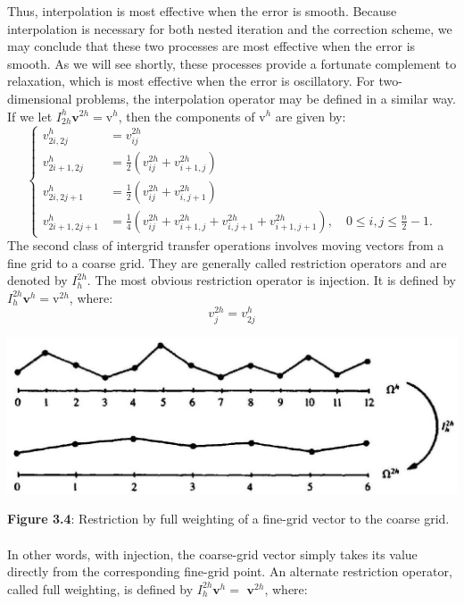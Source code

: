 \documentclass[11pt]{book}
\begin{document}
Thus, interpolation is most effective when the error is smooth. Because interpolation is necessary for both nested iteration and the correction scheme, we may conclude that these two processes are most effective when the error is smooth. As we will see shortly, these processes provide a fortunate complement to relaxation, which is most effective when the error is oscillatory.
For two-dimensional problems, the interpolation operator may be defined in a similar way. If we let $I_{2 h}^{h} \mathbf{v}^{2 h}=\mathrm{v}^{h}$, then the components of $\mathrm{v}^{h}$ are given by:
$$
\begin{cases}
v_{2 i, 2 j}^{h} & =v_{i j}^{2 h} \\
v_{2 i+1,2 j}^{h} & =\frac{1}{2}\left(v_{i j}^{2 h}+v_{i+1, j}^{2 h}\right) \\
v_{2 i, 2 j+1}^{h} & =\frac{1}{2}\left(v_{i j}^{2 h}+v_{i, j+1}^{2 h}\right) \\
v_{2 i+1,2 j+1}^{h} & =\frac{1}{4}\left(v_{i j}^{2 h}+v_{i+1, j}^{2 h}+v_{i, j+1}^{2 h}+v_{i+1, j+1}^{2 h}\right), \quad 0 \leq i, j \leq \frac{n}{2}-1 .
\end{cases}
$$
The second class of intergrid transfer operations involves moving vectors from a fine grid to a coarse grid. They are generally called restriction operators and are denoted by $I_{h}^{2 h}$. The most obvious restriction operator is injection. It is defined by $I_{h}^{2 h} \mathbf{v}^{h}=\mathrm{v}^{2 h}$, where:
$$
v_{j}^{2 h}=v_{2 j}^{h}
$$
\begin{center}
\includegraphics[max width=\textwidth]{2023_10_10_f3de0b9400b097aecf14g-049}
\end{center}
\textbf{Figure 3.4}: Restriction by full weighting of a fine-grid vector to the coarse grid. \\ \\
In other words, with injection, the coarse-grid vector simply takes its value directly from the corresponding fine-grid point. An alternate restriction operator, called full weighting, is defined by $I_{h}^{2 h} \mathbf{v}^{h}=$ $\mathbf{v}^{2 h}$, where:
\end{document}
